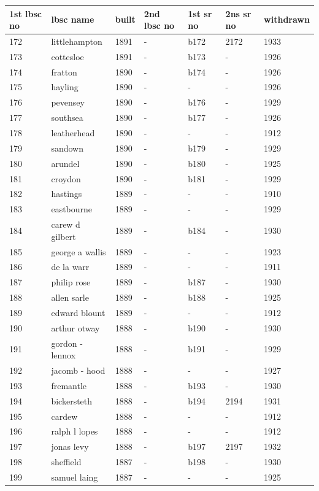 \documentclass{article}
\begin{document}
\begin{tabular}{lllllll}
\toprule
1st lbsc no & lbsc name & built & 2nd lbsc no & 1st sr no & 2ns sr no & withdrawn \\
\midrule
172 & littlehampton & 1891 & - & b172 & 2172 & 1933 \\
173 & cottesloe & 1891 & - & b173 & - & 1926 \\
174 & fratton & 1890 & - & b174 & - & 1926 \\
175 & hayling & 1890 & - & - & - & 1926 \\
176 & pevensey & 1890 & - & b176 & - & 1929 \\
177 & southsea & 1890 & - & b177 & - & 1926 \\
178 & leatherhead & 1890 & - & - & - & 1912 \\
179 & sandown & 1890 & - & b179 & - & 1929 \\
180 & arundel & 1890 & - & b180 & - & 1925 \\
181 & croydon & 1890 & - & b181 & - & 1929 \\
182 & hastings & 1889 & - & - & - & 1910 \\
183 & eastbourne & 1889 & - & - & - & 1929 \\
184 & carew d gilbert & 1889 & - & b184 & - & 1930 \\
185 & george a wallis & 1889 & - & - & - & 1923 \\
186 & de la warr & 1889 & - & - & - & 1911 \\
187 & philip rose & 1889 & - & b187 & - & 1930 \\
188 & allen sarle & 1889 & - & b188 & - & 1925 \\
189 & edward blount & 1889 & - & - & - & 1912 \\
190 & arthur otway & 1888 & - & b190 & - & 1930 \\
191 & gordon - lennox & 1888 & - & b191 & - & 1929 \\
192 & jacomb - hood & 1888 & - & - & - & 1927 \\
193 & fremantle & 1888 & - & b193 & - & 1930 \\
194 & bickersteth & 1888 & - & b194 & 2194 & 1931 \\
195 & cardew & 1888 & - & - & - & 1912 \\
196 & ralph l lopes & 1888 & - & - & - & 1912 \\
197 & jonas levy & 1888 & - & b197 & 2197 & 1932 \\
198 & sheffield & 1887 & - & b198 & - & 1930 \\
199 & samuel laing & 1887 & - & - & - & 1925 \\

\end{tabular}
\end{document}

